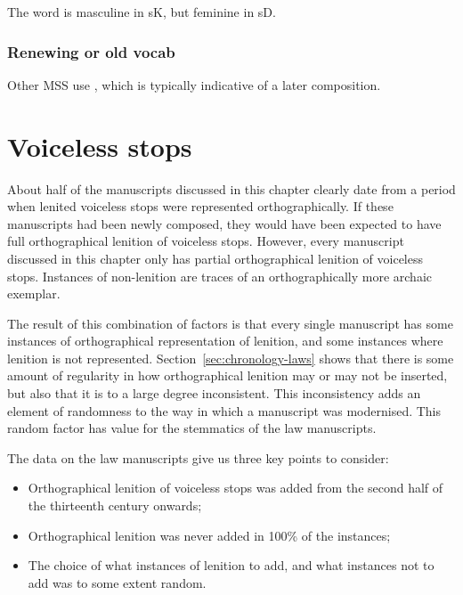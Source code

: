 The word  is masculine in \gls{sK}, but feminine in \gls{sD}.

\subsubsection{Renewing or old vocab}
\label{sec:renewing-or-old}


Other MSS use , which is typically indicative of a later composition.
\newpage
\section{Voiceless stops}
\label{sec:voiceless-stops}
About half of the manuscripts discussed in this chapter clearly date from a period when lenited voiceless stops were represented orthographically. If these manuscripts had been newly composed, they would have been expected to  have full orthographical lenition of voiceless stops. However, every manuscript discussed in this chapter only has partial orthographical lenition of voiceless stops. Instances of non-lenition are traces of an orthographically more archaic exemplar.

The result of this combination of factors is that every single  manuscript has some instances of orthographical representation of lenition, and some instances where lenition is not represented. Section~\ref{sec:chronology-laws} shows that there is some amount of regularity in how orthographical lenition may or may not be inserted, but also that it is to a large degree inconsistent. This inconsistency adds an element of randomness to the way in which a manuscript was modernised. This random factor has value for the stemmatics of the law manuscripts. 

The data on the law manuscripts give us three key points to consider:
\begin{itemize}
\item Orthographical lenition of voiceless stops was added from the second half of the thirteenth century onwards;
\item Orthographical lenition was never added in 100\% of the instances;
\item The choice of what instances of lenition to add, and what instances not to add was to some extent random.
\end{itemize}

